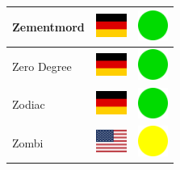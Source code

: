 \documentclass[12pt, a4paper, twoside]{report}
\begin{document}
\begin{center}
\begin{longtable}{|p{5cm}|p{2cm}|p{2cm}|}
 Zementmord                                                 & \includegraphics[width=1cm]{../4x3/de} &   \includegraphics[width=1cm]{../likes/y} \\ \hline
 Zero Degree                                                & \includegraphics[width=1cm]{../4x3/de} &   \includegraphics[width=1cm]{../likes/y} \\ \hline
 Zodiac                                                     & \includegraphics[width=1cm]{../4x3/de} &   \includegraphics[width=1cm]{../likes/y} \\ \hline
 Zombi                                                      & \includegraphics[width=1cm]{../4x3/us} &   \includegraphics[width=1cm]{../likes/m} \\ \hline
		\end{longtable}
	\end{center}
\end{document}
